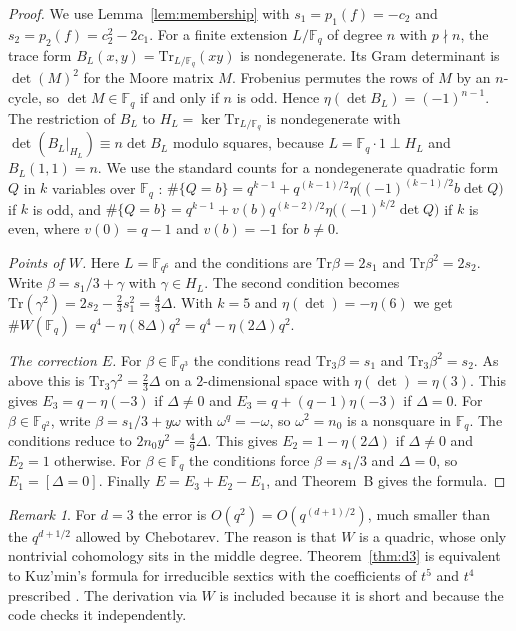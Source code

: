 \documentclass[11pt,a4paper]{article}
\theoremstyle{definition}
\theoremstyle{remark}
\newtheorem{remark}[theorem]{Remark}
\newcommand{\Fq}{\mathbb{F}_q}
\newcommand{\Tr}{\mathrm{Tr}}
\begin{document}
\begin{proof}
We use Lemma~\ref{lem:membership} with $s_1=p_1(f)=-c_2$ and $s_2=p_2(f)=c_2^2-2c_1$.
For a finite extension $L/\Fq$ of degree $n$ with $p\nmid n$, the trace form
$B_L(x,y)=\Tr_{L/\Fq}(xy)$ is nondegenerate. Its Gram determinant is $\det(M)^2$ for the Moore
matrix $M$. Frobenius permutes the rows of $M$ by an $n$-cycle, so $\det M\in\Fq$ if and only if
$n$ is odd. Hence $\eta(\det B_L)=(-1)^{n-1}$. The restriction of $B_L$ to $H_L=\ker\Tr_{L/\Fq}$
is nondegenerate with $\det(B_L|_{H_L})\equiv n\det B_L$ modulo squares, because
$L=\Fq\cdot1\perp H_L$ and $B_L(1,1)=n$.
We use the standard counts for a nondegenerate quadratic form $Q$ in $k$ variables over $\Fq$
\cite[Thms.~6.26, 6.27]{LN1997}:
$\#\{Q=b\}=q^{k-1}+q^{(k-1)/2}\eta\bigl((-1)^{(k-1)/2}b\det Q\bigr)$ if $k$ is odd, and
$\#\{Q=b\}=q^{k-1}+v(b)q^{(k-2)/2}\eta\bigl((-1)^{k/2}\det Q\bigr)$ if $k$ is even, where
$v(0)=q-1$ and $v(b)=-1$ for $b\neq0$.

\emph{Points of $W$.} Here $L=\mathbb{F}_{q^6}$ and the conditions are $\Tr\beta=2s_1$ and
$\Tr\beta^2=2s_2$. Write $\beta=s_1/3+\gamma$ with $\gamma\in H_L$. The second condition becomes
$\Tr(\gamma^2)=2s_2-\tfrac23s_1^2=\tfrac43\Delta$. With $k=5$ and $\eta(\det)=-\eta(6)$ we get
$\#W(\Fq)=q^4-\eta(8\Delta)q^2=q^4-\eta(2\Delta)q^2$.

\emph{The correction $E$.} For $\beta\in\mathbb{F}_{q^3}$ the conditions read $\Tr_3\beta=s_1$ and
$\Tr_3\beta^2=s_2$. As above this is $\Tr_3\gamma^2=\tfrac23\Delta$ on a $2$-dimensional space
with $\eta(\det)=\eta(3)$. This gives $E_3=q-\eta(-3)$ if $\Delta\ne0$ and
$E_3=q+(q-1)\eta(-3)$ if $\Delta=0$. For $\beta\in\mathbb{F}_{q^2}$, write $\beta=s_1/3+y\omega$
with $\omega^q=-\omega$, so $\omega^2=n_0$ is a nonsquare in $\Fq$. The conditions reduce to
$2n_0y^2=\tfrac49\Delta$. This gives $E_2=1-\eta(2\Delta)$ if $\Delta\ne0$ and $E_2=1$ otherwise.
For $\beta\in\Fq$ the conditions force $\beta=s_1/3$ and $\Delta=0$, so $E_1=[\Delta=0]$.
Finally $E=E_3+E_2-E_1$, and Theorem~B gives the formula.
\end{proof}

\begin{remark}
For $d=3$ the error is $O(q^2)=O(q^{(d+1)/2})$, much smaller than the
$q^{d+1/2}$ allowed by Chebotarev. The reason is that $W$ is a quadric, whose only
nontrivial cohomology sits in the middle degree. Theorem~\ref{thm:d3} is equivalent to
Kuz'min's formula for irreducible sextics with the coefficients of $t^5$ and $t^4$ prescribed
\cite{LL2016,MY2016}. The derivation via $W$ is included because it is short and
because the code checks it independently.
\end{remark}
\end{document}
